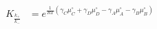 \begin{eqnarray}\label{eqn:equilibrium-constant}
K_
\frac{k_+}{k_-} &  = e^{\frac{1}{RT}\left(\gamma_C\mu_C^\circ+ \gamma_D\mu_D^\circ -\gamma_A\mu_A^\circ-\gamma_B\mu_B^\circ\right)} \\
\end{eqnarray}